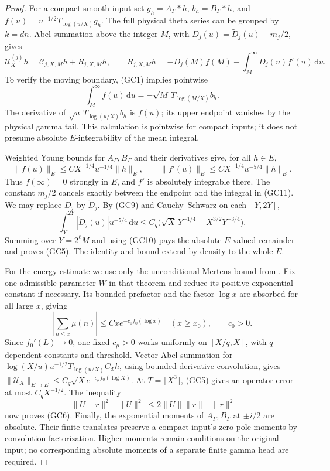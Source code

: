\documentclass[11pt]{article}
\theoremstyle{remark}\newtheorem{remark}[theorem]{Remark}
\newcommand{\dd}{\,\mathrm d}
\begin{document}
\begin{proof}
For a compact smooth input set
\(g_h=A_\Gamma*h\), \(b_h=B_\Gamma*h\), and
\(f(u)=u^{-1/2}T_{\log(u/X)}g_h\).
The full physical theta series can be grouped by \(k=d n\).
Abel summation above the integer \(M\), with
\(D_j(u)=\widetilde D_j(u)-m_j/2\), gives
\[
 \mathcal U_X^{(j)}h
 =\mathcal C_{j,X,M}h+R_{j,X,M}h,\qquad
 R_{j,X,M}h=-D_j(M)f(M)-\int_M^\infty D_j(u)f'(u)\dd u .
 \tag{GC11}
\]
To verify the moving boundary, (GC1) implies pointwise
\[
 \int_M^\infty f(u)\dd u
                 =-\sqrt M\,T_{\log(M/X)}b_h .
\]
The derivative of \(\sqrt u\,T_{\log(u/X)}b_h\) is \(f(u)\);
its upper endpoint vanishes by the physical gamma tail.
This calculation is pointwise for compact inputs; it does
not presume absolute \(E\)-integrability of the mean integral.

Weighted Young bounds for \(A_\Gamma,B_\Gamma\) and their
derivatives give, for all \(h\in E\),
\[
 \|f(u)\|_E\le C X^{-1/4}u^{-1/4}\|h\|_E,\qquad
 \|f'(u)\|_E\le C X^{-1/4}u^{-5/4}\|h\|_E .
\]
Thus \(f(\infty)=0\) strongly in \(E\), and \(f'\) is
absolutely integrable there. The constant \(m_j/2\)
cancels exactly between the endpoint and the integral in
(GC11). We may replace \(D_j\) by \(\widetilde D_j\).
By (GC9) and Cauchy--Schwarz on each \([Y,2Y]\),
\[
 \int_Y^{2Y}|\widetilde D_j(u)|u^{-5/4}\dd u
 \le C_q\bigl(\sqrt X\,Y^{-1/4}
                         +X^{3/2}Y^{-3/4}\bigr).
\]
Summing over \(Y=2^\ell M\) and using (GC10) pays the
absolute \(E\)-valued remainder and proves (GC5).
The identity and bound extend by density to the whole \(E\).

For the energy estimate we use only the unconditional Mertens
bound from \cite[Theorem 2.2, (23)]{LeeLeong}. Fix one
admissible parameter \(W\) in that theorem and reduce its
positive exponential constant if necessary. Its bounded
prefactor and the factor \(\log x\) are absorbed for all
large \(x\), giving
\[
 \left|\sum_{n\le x}\mu(n)\right|
 \le Cx e^{-c_0 f_0(\log x)}
 \quad(x\ge x_0),\qquad c_0>0 .
\]
Since \(f_0'(L)\to0\), one fixed \(c_\mu>0\) works uniformly
on \([X/q,X]\), with \(q\)-dependent constants and threshold.
Vector Abel summation for
\(\log(X/u)u^{-1/2}T_{\log(u/X)}C_\Phi h\),
using bounded derivative convolution, gives
\(\|\mathcal U_X\|_{E\to E}
 \le C_q\sqrt X e^{-c_\mu f_0(\log X)}\).
At \(T=\lceil X^3\rceil\), (GC5) gives an operator error
at most \(C_qX^{-1/2}\).
The inequality
\[
 \big|\|U-r\|^2-\|U\|^2\big|\le2\|U\|\|r\|+\|r\|^2
\]
now proves (GC6). Finally, the exponential moments of
\(A_\Gamma,B_\Gamma\) at \(\pm i/2\) are absolute.
Their finite translates preserve a compact input's zero
pole moments by convolution factorization. Higher moments
remain conditions on the original input; no corresponding
absolute moments of a separate finite gamma head are required.
\end{proof}
\end{document}
